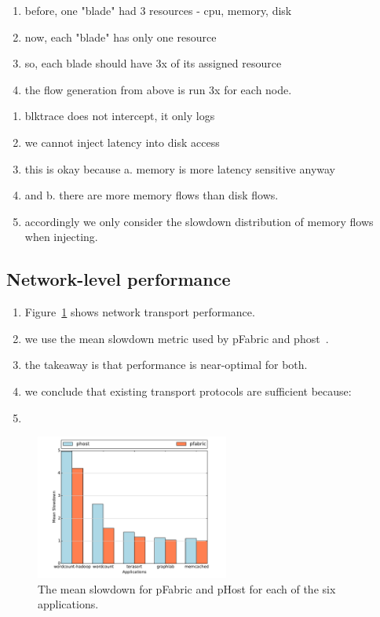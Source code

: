 \begin{enumerate}
\item before, one "blade" had 3 resources - cpu, memory, disk
\item now, each "blade" has only one resource
\item so, each blade should have 3x of its assigned resource
\item the flow generation from above is run 3x for each node.
\end{enumerate}

\begin{enumerate}
\item blktrace does not intercept, it only logs
\item we cannot inject latency into disk access
\item this is okay because a. memory is more latency sensitive anyway 
\item and b. there are more memory flows than disk flows.
\item accordingly we only consider the slowdown distribution of memory flows when injecting.
\end{enumerate}

\subsection{Network-level performance}
\begin{enumerate}
\item Figure~\ref{fig:phostp} shows network transport performance.
\item we use the mean slowdown metric used by pFabric and phost~\cite{pfabric, phost}.
\item the takeaway is that performance is near-optimal for both.
\item we conclude that existing transport protocols are sufficient because:
\item {}
\end{enumerate}
\label{ssec:nlp}

%
\begin{figure}
  \centering
    \includegraphics[width = 2.5in]{img/fig12_slowdownsGraph} 
  \caption{\small{The mean slowdown for pFabric and pHost for each of the six applications. }}
  \label{fig:phostp}
\end{figure}
%

